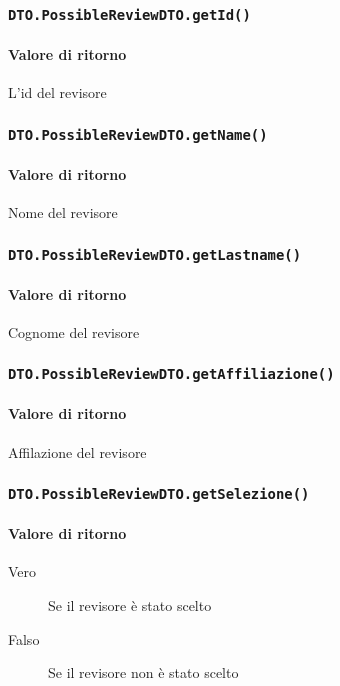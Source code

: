 \subsubsection{\texttt{DTO.PossibleReviewDTO.getId()}}
\paragraph{Valore di ritorno}
\begin{description}
\item L'id del revisore
\end{description}
\subsubsection{\texttt{DTO.PossibleReviewDTO.getName()}}
\paragraph{Valore di ritorno}
\begin{description}
\item Nome del revisore
\end{description}
\subsubsection{\texttt{DTO.PossibleReviewDTO.getLastname()}}
\paragraph{Valore di ritorno}
\begin{description}
\item Cognome del revisore
\end{description}
\subsubsection{\texttt{DTO.PossibleReviewDTO.getAffiliazione()}}
\paragraph{Valore di ritorno}
\begin{description}
\item Affilazione del revisore
\end{description}
\subsubsection{\texttt{DTO.PossibleReviewDTO.getSelezione()}}
\paragraph{Valore di ritorno}
\begin{description}
\item [Vero] Se il revisore è stato scelto
\item [Falso] Se il revisore non è stato scelto
\end{description}

